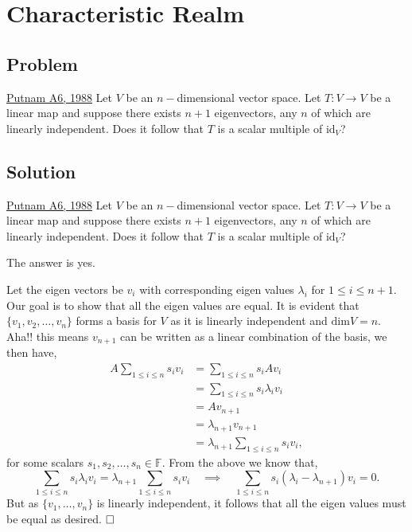 \section{Characteristic Realm}
\subsection{Problem}
\begin{problem}{1}{\href{https://artofproblemsolving.com/community/u571929h1889881p35784025}{Putnam A6, 1988}}
		Let $V$ be an $n-$dimensional vector space. Let $T:V\to V$ be a linear map and suppose there exists $n+1$ eigenvectors, any $n$ of which are linearly independent. Does it follow that $T$ is a scalar multiple of $\mathrm{id}_V$?
\end{problem}

\subsection{Solution}
\begin{problem}{1}{\href{https://artofproblemsolving.com/community/u571929h1889881p35784025}{Putnam A6, 1988}}
		Let $V$ be an $n-$dimensional vector space. Let $T:V\to V$ be a linear map and suppose there exists $n+1$ eigenvectors, any $n$ of which are linearly independent. Does it follow that $T$ is a scalar multiple of $\mathrm{id}_V$?
	\begin{solution} The answer is yes.
		\par Let the eigen vectors be $v_i$ with corresponding eigen values $\lambda_i$ for $1\le i\le n+1$. Our goal is to show that all the eigen values are equal. It is evident that $\{v_1, v_2,\ldots, v_n\}$ forms a basis for $V$ as it is linearly independent and $\mathrm{dim} V=n$. Aha!! this means $v_{n+1}$ can be written as a linear combination of the basis, we then have,
		\begin{align*}		
			A\sum_{1\le i\le n}s_iv_i&=\sum_{1\le i\le n}s_iA v_i\\
			&=\sum_{1\le i\le n}s_i\lambda_iv_i\\
			&=Av_{n+1}\\
			&=\lambda_{n+1}v_{n+1}\\
			&=\lambda_{n+1}\sum_{1\le i\le n}s_{i}v_i,
		\end{align*}
		for some scalars $s_1,s_2,\ldots, s_{n}\in\mathbb{F}$. From the above we know that,
		$$\sum_{1\le i\le n}s_i\lambda_iv_i=\lambda_{n+1}\sum_{1\le i\le n}s_{i}v_i\quad\implies\quad\sum_{1\le i\le n}s_i(\lambda_i-\lambda_{n+1})v_i=0.$$
		But as $\{v_1,\ldots, v_n\}$ is linearly independent, it follows that all the eigen values must be equal as desired. $\qedwhite$	
	\end{solution}
\end{problem}

